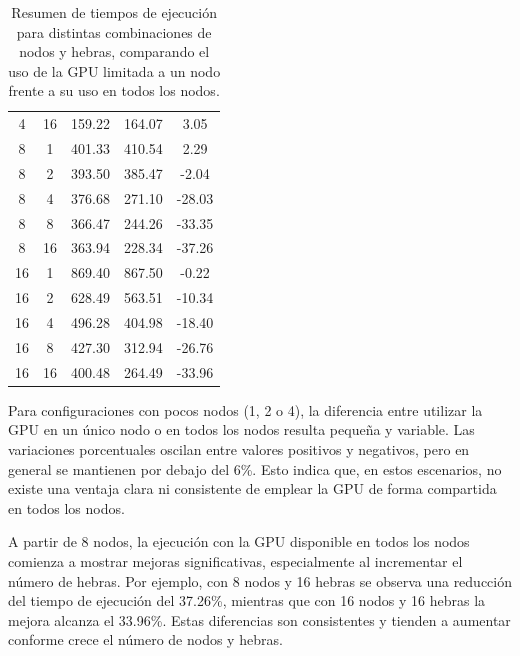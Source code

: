 \begin{table}[ht]
\begin{tabular}{|c|c|c|c|c|}
        4              & 16              & 159.22                  & 164.07                 & 3.05               \\
        8              & 1               & 401.33                  & 410.54                 & 2.29               \\
        8              & 2               & 393.50                  & 385.47                 & -2.04              \\
        8              & 4               & 376.68                  & 271.10                 & -28.03             \\
        8              & 8               & 366.47                  & 244.26                 & -33.35             \\
        8              & 16              & 363.94                  & 228.34                 & -37.26             \\
        16             & 1               & 869.40                  & 867.50                 & -0.22              \\
        16             & 2               & 628.49                  & 563.51                 & -10.34             \\
        16             & 4               & 496.28                  & 404.98                 & -18.40             \\
        16             & 8               & 427.30                  & 312.94                 & -26.76             \\
        16             & 16              & 400.48                  & 264.49                 & -33.96             \\
        \hline
    \end{tabular}
    \caption{Resumen de tiempos de ejecución para distintas combinaciones de nodos y hebras, comparando el uso de la GPU limitada a un nodo frente a su uso en todos los nodos.}
    \label{tab:summary_nodes_threads_gpu}
\end{table}

Para configuraciones con pocos nodos (1, 2 o 4), la diferencia entre utilizar la GPU en un único nodo o en todos los nodos resulta pequeña y variable. Las variaciones porcentuales oscilan entre valores positivos y negativos, pero en general se mantienen por debajo del 6\%. Esto indica que, en estos escenarios, no existe una ventaja clara ni consistente de emplear la GPU de forma compartida en todos los nodos.

A partir de 8 nodos, la ejecución con la GPU disponible en todos los nodos comienza a mostrar mejoras significativas, especialmente al incrementar el número de hebras. Por ejemplo, con 8 nodos y 16 hebras se observa una reducción del tiempo de ejecución del 37.26\%, mientras que con 16 nodos y 16 hebras la mejora alcanza el 33.96\%. Estas diferencias son consistentes y tienden a aumentar conforme crece el número de nodos y hebras.

